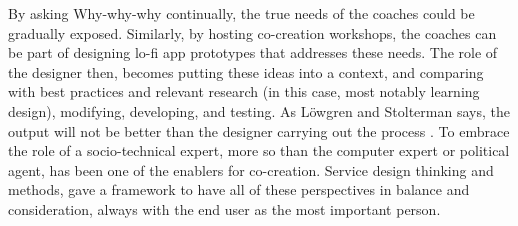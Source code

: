   By asking Why-why-why continually, the true needs of the coaches could be gradually exposed. Similarly, by hosting co-creation workshops, the coaches can be part of designing lo-fi app prototypes that addresses these needs. The role of the designer then, becomes putting these ideas into a context, and comparing with best practices and relevant research (in this case, most notably learning design), modifying, developing, and testing. As Löwgren and Stolterman says, the output will not be better than the designer carrying out the process \cite{lowgren}. To embrace the role of a socio-technical expert, more so than the computer expert or political agent, has been one of the enablers for co-creation. Service design thinking and methods, gave a framework to have all of these perspectives in balance and consideration, always with the end user as the most important person.












